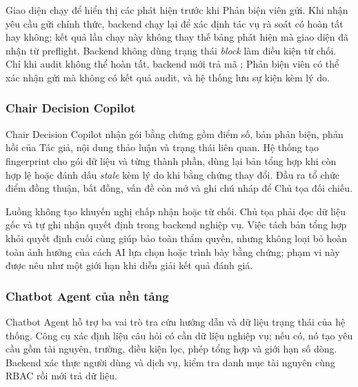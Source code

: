 Giao diện chạy  để hiển thị các phát hiện trước khi Phản biện viên gửi. Khi nhận yêu cầu gửi chính thức, backend chạy lại  để xác định tác vụ rà soát có hoàn tất hay không; kết quả lần chạy này không thay thế bảng phát hiện mà giao diện đã nhận từ preflight. Backend không dùng trạng thái \textit{block} làm điều kiện từ chối. Chỉ khi audit không thể hoàn tất, backend mới trả mã ; Phản biện viên có thể xác nhận gửi mà không có kết quả audit, và hệ thống lưu sự kiện  kèm lý do.

\subsubsection{Chair Decision Copilot}

Chair Decision Copilot nhận gói bằng chứng gồm điểm số, bản phản biện, phản hồi của Tác giả, nội dung thảo luận và trạng thái liên quan. Hệ thống tạo fingerprint cho gói dữ liệu và từng thành phần, dùng lại bản tổng hợp khi còn hợp lệ hoặc đánh dấu \textit{stale} kèm lý do khi bằng chứng thay đổi. Đầu ra tổ chức điểm đồng thuận, bất đồng, vấn đề còn mở và ghi chú nháp để Chủ tọa đối chiếu.

Luồng không tạo khuyến nghị chấp nhận hoặc từ chối. Chủ tọa phải đọc dữ liệu gốc và tự ghi nhận quyết định trong backend nghiệp vụ. Việc tách bản tổng hợp khỏi quyết định cuối cùng giúp bảo toàn thẩm quyền, nhưng không loại bỏ hoàn toàn ảnh hưởng của cách AI lựa chọn hoặc trình bày bằng chứng; phạm vi này được nêu như một giới hạn khi diễn giải kết quả đánh giá.

\subsubsection{Chatbot Agent của nền tảng}

Chatbot Agent hỗ trợ ba vai trò tra cứu hướng dẫn và dữ liệu trạng thái của hệ thống. Công cụ xác định liệu câu hỏi có cần dữ liệu nghiệp vụ; nếu có, nó tạo yêu cầu gồm tài nguyên, trường, điều kiện lọc, phép tổng hợp và giới hạn số dòng. Backend xác thực người dùng và dịch vụ, kiểm tra danh mục tài nguyên cùng RBAC rồi mới trả dữ liệu.

